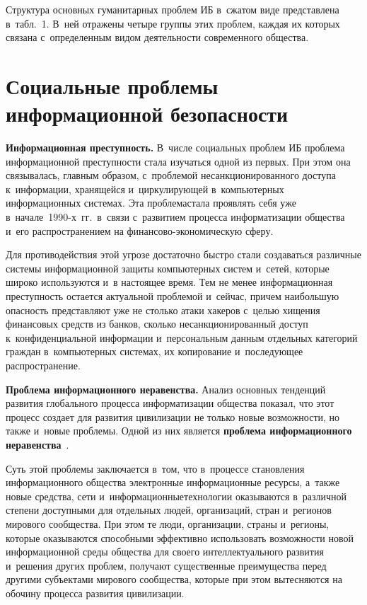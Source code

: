 \begin{multicols}{2}
   Структура основных гуманитарных проблем 
ИБ в~сжатом виде представлена в~табл.~1. В~ней отражены 
четыре группы этих проблем, каждая их которых связана с~определенным 
видом деятель\-ности современного общества.



\section{Социальные проблемы информационной безопасности}

   \textbf{Информационная преступность.} В~числе социальных проблем 
ИБ проблема информационной преступности 
стала изучаться одной из первых. При этом она связывалась, главным 
образом, с~проб\-ле\-мой несанкционированного доступа к~информации, 
хранящейся и~циркулирующей в~компьютерных информационных сис\-те\-мах. 
Эта проб\-ле\-ма\linebreak стала проявлять себя уже в~начале~1990-х~гг.\ в~связи 
с~развитием процесса информатизации общества и~его распространением на 
фи\-нан\-со\-во-эко\-но\-ми\-че\-скую сферу. 
   
   Для противодействия этой угрозе достаточно быст\-ро стали создаваться 
различные системы информационной защиты компьютерных сис\-тем и~сетей, 
которые широко используются и~в настоящее время. Тем не менее 
информационная преступность остается актуальной проблемой и~сейчас, 
причем наибольшую опасность представляют уже не столько атаки хакеров 
с~целью хищения финансовых средств из банков, сколько 
несанкционированный доступ к~конфиденциальной информации 
и~персональным данным отдельных категорий граж\-дан в~компьютерных 
системах, их копирование и~последующее распространение.
   
   \textbf{Проблема информационного неравенства.} Анализ основных 
тенденций развития глобального процесса информатизации общества 
показал, что этот процесс создает для развития цивилизации не только новые 
возможности, но также и~новые проблемы. Одной из них является 
\textbf{проблема информационного неравенства}~\cite{17-kol}.
   
    Суть этой проблемы заключается в~том, что в~процессе становления 
информационного общества электронные информационные ресурсы, а~также 
новые средства, сети и~информационные\linebreak техноло\-гии оказываются 
в~различной степени доступными для отдельных людей, организаций, стран 
и~регионов мирового сообщества. При этом те люди, организации, страны 
и~регионы, которые оказываются способными эффективно использовать 
возможности новой информационной среды общества для своего 
интеллектуального развития и~решения других проблем, получают 
существенные преимущества перед другими субъектами мирового 
сообщества, которые при этом вытесняются на обочину процесса развития 
цивилизации.
    

\end{multicols}
